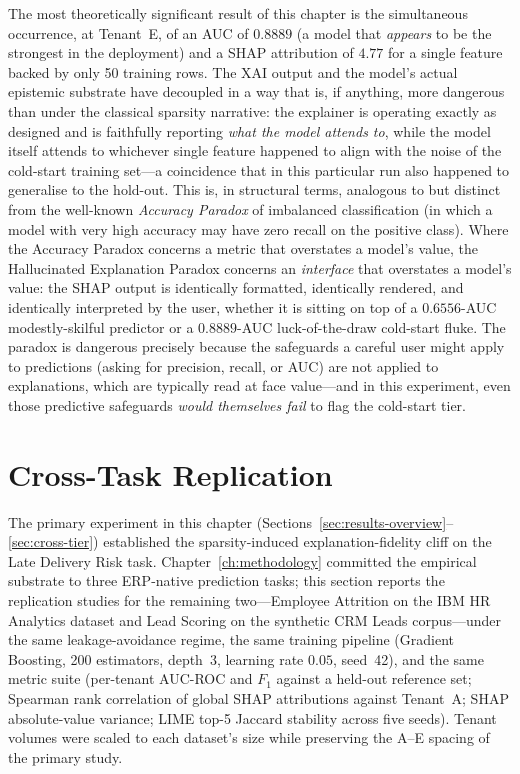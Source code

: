 The most theoretically significant result of this chapter is the
simultaneous occurrence, at Tenant~E, of an AUC of $0.8889$ (a model that
\emph{appears} to be the strongest in the deployment) and a SHAP
attribution of $4.77$ for a single feature backed by only 50 training
rows. The XAI output and the model's actual epistemic substrate have
decoupled in a way that is, if anything, more dangerous than under the
classical sparsity narrative: the explainer is operating exactly as
designed and is faithfully reporting \emph{what the model attends to},
while the model itself attends to whichever single feature happened to
align with the noise of the cold-start training set---a coincidence that
in this particular run also happened to generalise to the hold-out.
This is, in structural terms, analogous to but distinct from the
well-known \emph{Accuracy Paradox} of imbalanced classification (in which
a model with very high accuracy may have zero recall on the positive
class). Where the Accuracy Paradox concerns a metric that overstates a
model's value, the Hallucinated Explanation Paradox concerns an
\emph{interface} that overstates a model's value: the SHAP output is
identically formatted, identically rendered, and identically interpreted
by the user, whether it is sitting on top of a $0.6556$-AUC modestly-skilful
predictor or a $0.8889$-AUC luck-of-the-draw cold-start fluke. The paradox
is dangerous precisely because the safeguards a careful user might apply
to predictions (asking for precision, recall, or AUC) are not applied to
explanations, which are typically read at face value---and in this
experiment, even those predictive safeguards \emph{would themselves fail}
to flag the cold-start tier.

\section{Cross-Task Replication}
\label{sec:cross-task-replication}

The primary experiment in this chapter (Sections~\ref{sec:results-overview}--\ref{sec:cross-tier})
established the sparsity-induced explanation-fidelity cliff on the Late
Delivery Risk task. Chapter~\ref{ch:methodology} committed the empirical
substrate to three ERP-native prediction tasks; this section reports
the replication studies for the remaining two---Employee Attrition on
the IBM HR Analytics dataset and Lead Scoring on the synthetic CRM
Leads corpus---under the same leakage-avoidance regime, the same
training pipeline (Gradient Boosting, 200 estimators, depth~3, learning
rate $0.05$, seed~42), and the same metric suite (per-tenant AUC-ROC
and $F_1$ against a held-out reference set; Spearman rank correlation
of global SHAP attributions against Tenant~A; SHAP absolute-value
variance; LIME top-5 Jaccard stability across five seeds). Tenant
volumes were scaled to each dataset's size while preserving the
A--E spacing of the primary study.

